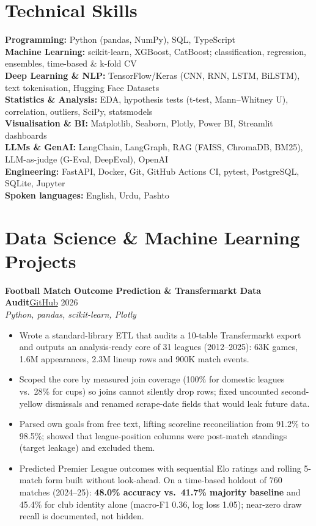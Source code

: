 \documentclass[10pt,a4paper]{article}
\newcommand{\project}[3]{%
  \par\addvspace{5pt}\needspace{6\baselineskip}\textbf{#1}\hfill{\small #2}\\[-1pt]
  {\small\itshape\color{muted} #3}\par}
\begin{document}
\section{Technical Skills}
\textbf{Programming:} Python (pandas, NumPy), SQL, TypeScript\\
\textbf{Machine Learning:} scikit-learn, XGBoost, CatBoost; classification, regression, ensembles,
time-based \& k-fold CV\\
\textbf{Deep Learning \& NLP:} TensorFlow/Keras (CNN, RNN, LSTM, BiLSTM), text tokenisation,
Hugging Face Datasets\\
\textbf{Statistics \& Analysis:} EDA, hypothesis tests (t-test, Mann--Whitney U), correlation,
outliers, SciPy, statsmodels\\
\textbf{Visualisation \& BI:} Matplotlib, Seaborn, Plotly, Power BI, Streamlit dashboards\\
\textbf{LLMs \& GenAI:} LangChain, LangGraph, RAG (FAISS, ChromaDB, BM25), LLM-as-judge
(G-Eval, DeepEval), OpenAI\\
\textbf{Engineering:} FastAPI, Docker, Git, GitHub Actions CI, pytest, PostgreSQL, SQLite, Jupyter\\
\textbf{Spoken languages:} English, Urdu, Pashto

\section{Data Science \& Machine Learning Projects}

\project{Football Match Outcome Prediction \& Transfermarkt Data Audit}
  {\href{https://github.com/Shah-123/football-match-outcome-prediction}{GitHub} \textbar{} 2026}
  {Python, pandas, scikit-learn, Plotly}
\begin{itemize}
  \item Wrote a standard-library ETL that audits a 10-table Transfermarkt export and
        outputs an analysis-ready core of 31 leagues (2012--2025): 63K games, 1.6M appearances,
        2.3M lineup rows and 900K match events.
  \item Scoped the core by measured join coverage (100\% for domestic leagues vs.\ 28\% for cups) so
        joins cannot silently drop rows; fixed uncounted second-yellow dismissals and renamed
        scrape-date fields that would leak future data.
  \item Parsed own goals from free text, lifting scoreline reconciliation from 91.2\% to 98.5\%;
        showed that league-position columns were post-match standings (target leakage) and excluded them.
  \item Predicted Premier League outcomes with sequential Elo ratings and rolling 5-match form built
        without look-ahead. On a time-based holdout of 760 matches (2024--25): \textbf{48.0\% accuracy
        vs.\ 41.7\% majority baseline} and 45.4\% for club identity alone (macro-F1 0.36, log loss
        1.05); near-zero draw recall is documented, not hidden.
\end{itemize}
\end{document}
